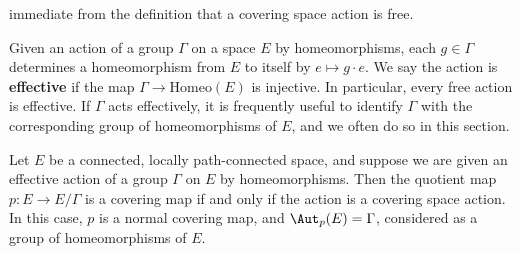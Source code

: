 immediate from the definition that a covering space action is free.\par
Given an action of a group $\Gamma$ on a space $E$ by homeomorphisms, each 
$g\in\Gamma$ determines a homeomorphism from $E$ to itself by $e\mapsto g\cdot e$. 
We say the action is \textbf{effective} if the map $\Gamma\to\mathrm{Homeo}(E)$ is 
injective. In particular, every free action is effective. If $\Gamma$ acts effectively, it 
is frequently useful to identify $\Gamma$ with the corresponding group of 
homeomorphisms of $E$, and we often do so in this section.
\begin{theorem}\label{cover map iff cover action}
Let $E$ be a connected, locally path-connected space, and suppose we are given an effective action of a group $\Gamma$ on $E$ by homeomorphisms. Then the quotient map $p:E\to E/\Gamma$ is a covering map if and only if the action is a covering space action. In this case, $p$ is a normal covering map, and $\Aut_p(E)=\Gamma$, considered as a group of homeomorphisms of $E$.
\end{theorem}
